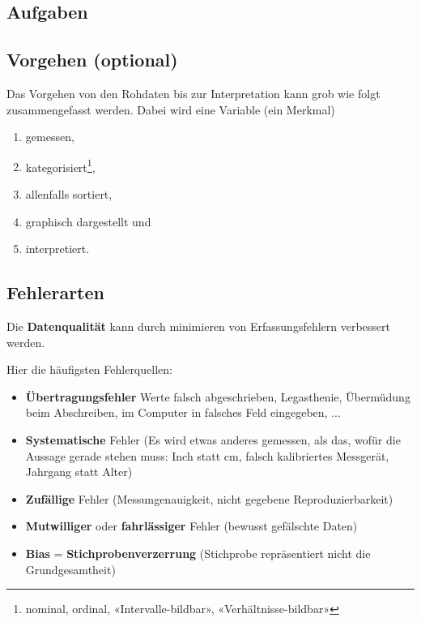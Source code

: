 \subsection*{Aufgaben}

\subsection{Vorgehen (optional)}
Das Vorgehen von den Rohdaten bis zur Interpretation kann grob wie folgt zusammengefasst werden. Dabei wird eine Variable (ein Merkmal)
\begin{enumerate}
\item gemessen,
\item kategorisiert\footnote{nominal, ordinal, «Intervalle-bildbar»,
    «Verhältnisse-bildbar»},
\item allenfalls sortiert,
\item graphisch dargestellt und
\item interpretiert.
\end{enumerate}
\newpage


\subsection{Fehlerarten}


Die \textbf{Datenqualität} kann durch minimieren
von Erfassungsfehlern verbessert werden.

Hier die häufigsten Fehlerquellen:


\begin{itemize}
  
\item \textbf{Übertragungsfehler} {Werte falsch abgeschrieben, 
  Legasthenie, Übermüdung beim Abschreiben, im Computer in falsches
  Feld eingegeben, ...}

\item \textbf{Systematische} Fehler (Es wird etwas anderes gemessen, als das,
  wofür die Aussage gerade stehen muss: Inch statt cm, falsch
  kalibriertes Messgerät, Jahrgang statt Alter)

\item \textbf{Zufällige} Fehler (Messungenauigkeit, nicht gegebene Reproduzierbarkeit)

\item \textbf{Mutwilliger} oder \textbf{fahrlässiger} Fehler (bewusst
  gefälschte Daten)

\item \textbf{Bias} =
  \textbf{Stichprobenverzerrung}
  (Stichprobe repräsentiert nicht die Grundgesamtheit)
\end{itemize}

